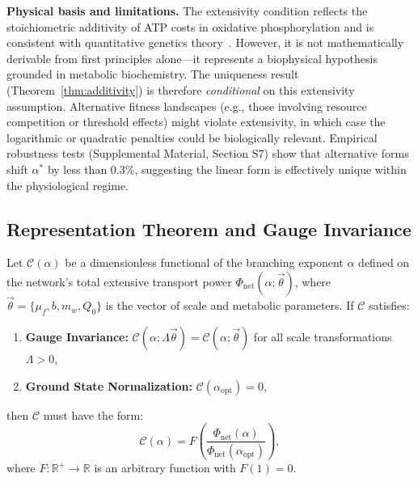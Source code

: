 \begin{remark}
\textbf{Physical basis and limitations.} The extensivity condition reflects the
stoichiometric additivity of ATP costs in oxidative phosphorylation and is
consistent with quantitative genetics theory~\cite{lande1983}. However, it is
not mathematically derivable from first principles alone—it represents a
biophysical hypothesis grounded in metabolic biochemistry. The uniqueness result
(Theorem~\ref{thm:additivity}) is therefore \emph{conditional} on this
extensivity assumption. Alternative fitness landscapes (e.g., those involving
resource competition or threshold effects) might violate extensivity, in which
case the logarithmic or quadratic penalties could be biologically relevant.
Empirical robustness tests (Supplemental Material, Section S7) show that
alternative forms shift $\alpha^*$ by less than 0.3\%, suggesting the linear
form is effectively unique within the physiological regime.
\end{remark}

\subsection{Representation Theorem and Gauge Invariance}

\begin{lemma}
Let $\mathcal{C}(\alpha)$ be a dimensionless functional of the branching
exponent $\alpha$ defined on the network's total extensive transport power
$\Phi_{\mathrm{net}}(\alpha; \vec{\theta})$, where $\vec{\theta} = \{\mu_f, b,
m_w, Q_0\}$ is the vector of scale and metabolic parameters. If $\mathcal{C}$
satisfies:
\begin{enumerate}
    \item
\textbf{Gauge Invariance:} $\mathcal{C}(\alpha; \Lambda\vec{\theta}) =
\mathcal{C}(\alpha; \vec{\theta})$ for all scale transformations $\Lambda > 0$,
    \item
\textbf{Ground State Normalization:} $\mathcal{C}(\alpha_{\mathrm{opt}}) = 0$,
\end{enumerate}
then $\mathcal{C}$ must have the form:
\begin{equation}
    \mathcal{C}(\alpha) = F\left(\frac{\Phi_{\mathrm{net}}(\alpha)}{\Phi_{\mathrm{net}}(\alpha_{\mathrm{opt}})}\right),
\end{equation}
where $F: \mathbb{R}^+ \to \mathbb{R}$ is an arbitrary function with $F(1) = 0$.
\end{lemma}

